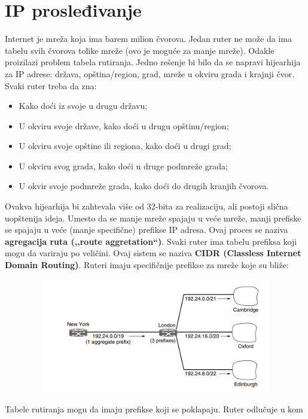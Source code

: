 \documentclass[a4paper]{article}
\begin{document}
\section{IP prosleđivanje}
    Internet je mreža koja ima barem milion čvorova. Jedan ruter ne može da ima tabelu svih čvorova
    tolike mreže (ovo je moguće za manje mreže). Odakle proizilazi problem tabela rutiranja. 
    Jedno rešenje bi bilo da se napravi hijearhija za IP adrese: država, opština/region, grad, 
    mreže u okviru grada i krajnji čvor. Svaki ruter treba da zna:
    \begin{itemize}
        \item Kako doći iz svoje u drugu državu;
        \item U okviru svoje države, kako doći u drugu opštinu/region;
        \item U okviru svoje opštine ili regiona, kako doći u drugi grad;
        \item U okviru svog grada, kako doći u druge podmreže grada;
        \item U okvir svoje podmreže grada, kako doći do drugih kranjih čvorova. 
    \end{itemize} 
    Ovakva hijearhija bi zahtevala više od 32-bita za realizaciju, ali postoji slična uopštenija
    ideja. Umesto da se manje mreže spajaju u veće mreže, manji prefiske se spajaju u veće 
    (manje specifične) prefikse IP adresa. Ovaj proces se naziva \textbf{agregacija ruta (,,route 
    aggretation``)}. Svaki ruter ima tabelu prefiksa koji mogu da variraju po veličini. Ovaj
    sistem se naziva \textbf{CIDR (Classless Internet Domain Routing)}. Ruteri imaju specifičnije
    prefikse za mreže koje su bliže:
    \begin{figure}[H]
        \begin{center}
            \includegraphics[width=120mm,height=50mm]{Slike/cidr1.png}
        \end{center}
    \end{figure}
    Tabele rutiranja mogu da imaju prefikse koji se poklapaju. Ruter odlučuje u kom
\end{document}
